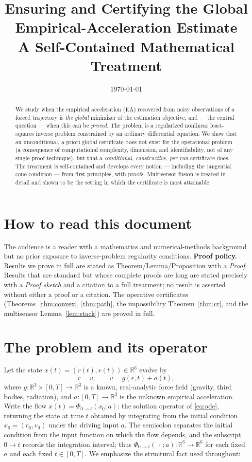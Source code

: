 \documentclass[11pt]{article}
\title{\bfseries Ensuring and Certifying the Global\\
Empirical-Acceleration Estimate\\[4pt]
\large A Self-Contained Mathematical Treatment}
\author{}
\date{\today}
\theoremstyle{plain}
\theoremstyle{definition}
\theoremstyle{remark}
\newcommand{\R}{\mathbb{R}}
\begin{document}
\maketitle

\begin{abstract}
We study when the empirical acceleration (EA) recovered from noisy
observations of a forced trajectory is \emph{the global} minimizer of the
estimation objective, and --- the central question --- when this can be
\emph{proved}. The problem is a regularized nonlinear least-squares
inverse problem constrained by an ordinary differential equation. We
show that an unconditional, a-priori global certificate does not exist for
the operational problem (a consequence of computational complexity,
dimension, and identifiability, not of any single proof technique), but
that a \emph{conditional, constructive, per-run} certificate does. The
treatment is self-contained and develops every notion --- including the
tangential cone condition --- from first principles, with proofs.
Multisensor fusion is treated in detail and shown to be the setting in
which the certificate is most attainable.
\end{abstract}

\section*{How to read this document}
The audience is a reader with a mathematics and numerical-methods
background but no prior exposure to inverse-problem regularity conditions.
\textbf{Proof policy.} Results we prove in full are stated as
Theorem/Lemma/Proposition with a \emph{Proof}. Results that are standard
but whose complete proofs are long are stated precisely with a
\emph{Proof sketch} and a citation to a full treatment; no result is
asserted without either a proof or a citation. The operative certificates
(Theorems~\ref{thm:convex}, \ref{thm:path}, the impossibility
Theorem~\ref{thm:cr}, and the multisensor Lemma~\ref{lem:stack}) are
proved in full.

\section{The problem and its operator}\label{sec:prob}

Let the state $x(t)=(r(t),v(t))\in\R^{6}$ evolve by
\begin{equation}
\dot r = v,\qquad \dot v = g(r,t) + a(t),
\label{eq:ode}
\end{equation}
where $g:\R^{3}\times[0,T]\to\R^{3}$ is a known, real-analytic force
field (gravity, third bodies, radiation), and $a:[0,T]\to\R^{3}$ is the
unknown empirical acceleration. Write the flow
$x(t)=\Phi_{0\to t}(x_0;a)$: the solution operator of \eqref{eq:ode},
returning the state at time $t$ obtained by integrating from the
initial condition $x_0=(r_0,v_0)$ under the driving input $a$. The
semicolon separates the initial condition from the input function on
which the flow depends, and the subscript $0\to t$ records the
integration interval; thus $\Phi_{0\to t}(\,\cdot\,;a):\R^{6}\to\R^{6}$
for each fixed $a$ and each fixed $t\in[0,T]$. We emphasize the
structural fact used throughout:
\end{document}
